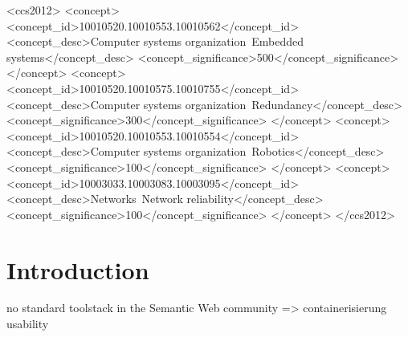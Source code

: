 \documentclass[sigconf]{acmart}
\begin{document}
\begin{CCSXML}
	<ccs2012>
	<concept>
	<concept_id>10010520.10010553.10010562</concept_id>
	<concept_desc>Computer systems organization~Embedded systems</concept_desc>
	<concept_significance>500</concept_significance>
	</concept>
	<concept>
	<concept_id>10010520.10010575.10010755</concept_id>
	<concept_desc>Computer systems organization~Redundancy</concept_desc>
	<concept_significance>300</concept_significance>
	</concept>
	<concept>
	<concept_id>10010520.10010553.10010554</concept_id>
	<concept_desc>Computer systems organization~Robotics</concept_desc>
	<concept_significance>100</concept_significance>
	</concept>
	<concept>
	<concept_id>10003033.10003083.10003095</concept_id>
	<concept_desc>Networks~Network reliability</concept_desc>
	<concept_significance>100</concept_significance>
	</concept>
	</ccs2012>
\end{CCSXML}



\maketitle

\section{Introduction}

no standard toolstack in the Semantic Web community => containerisierung 
usability
\end{document}
